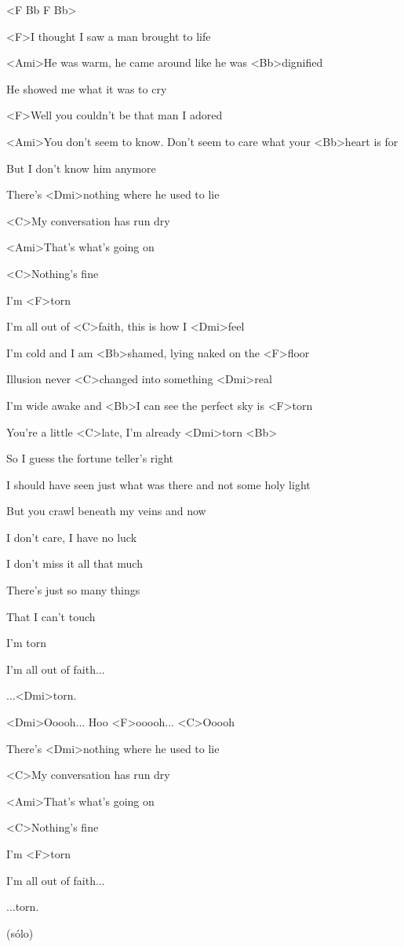 
<F Bb F Bb>

\zs
<F>I thought I saw a man brought to life

<Ami>He was warm, he came around like he was <Bb>dignified

He showed me what it was to cry

<F>Well you couldn't be that man I adored 

<Ami>You don't seem to know. Don't seem to care what your <Bb>heart is for

But I don't know him anymore 

There's <Dmi>nothing where he used to lie

<C>My conversation has run dry

<Ami>That's what's going on

<C>Nothing's fine

I'm <F>torn
\ks

\zr
I'm all out of <C>faith, this is how I <Dmi>feel

I'm cold and I am <Bb>shamed, lying naked on the <F>floor

Illusion never <C>changed into something <Dmi>real

I'm wide awake and <Bb>I can see the perfect sky is <F>torn

You're a little <C>late, I'm already <Dmi>torn <Bb>
\kr

\zs
So I guess the fortune teller's right

I should have seen just what was there and not some holy light

But you crawl beneath my veins and now

I don't care, I have no luck

I don't miss it all that much 

There's just so many things

That I can't touch

I'm torn
\ks

\zr
I'm all out of faith...

...<Dmi>torn.
\kr

\hvezda
<Dmi>Ooooh... Hoo <F>ooooh... <C>Ooooh

There's <Dmi>nothing where he used to lie

<C>My conversation has run dry

<Ami>That's what's going on

<C>Nothing's fine

I'm <F>torn
\ks

\zr
I'm all out of faith...

...torn.
\kr

\zr
(sólo)
\kr

\kp
